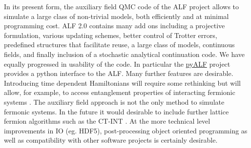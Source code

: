 
In its present form, the  auxiliary field QMC code of the ALF project  allows to simulate a large class of non-trivial models, both efficiently and at minimal  programming cost.  ALF 2.0 contains many add ons including a projective formulation, various updating schemes, better control of Trotter errors, predefined structures that facilitate reuse, a large class of models, continuous fields,  and  finally inclusion  of a stochastic analytical continuation code.   
We have equally progressed in usability of the code. In particular the \href{https://git.physik.uni-wuerzburg.de/ALF/pyALF}{pyALF}   project provides a python interface to the ALF. 
Many further features are desirable.  Introducing time dependent Hamiltonians will require  some   rethinking  but will  allow, for example, to access  entanglement properties of interacting fermionic systems \cite{Broecker14,Assaad14,Assaad13a,Assaad15}.  The auxiliary field approach is not the only method to simulate fermonic systems.   In the future it would desirable to include further lattice fermion algorithms such as the CT-INT \cite{Rubtsov05,Assaad07}.   At the more technical level  improvements  in IO  (eg. HDF5), post-processing   object oriented  programming as well as  compatibility with other software projects is certainly desirable. 
